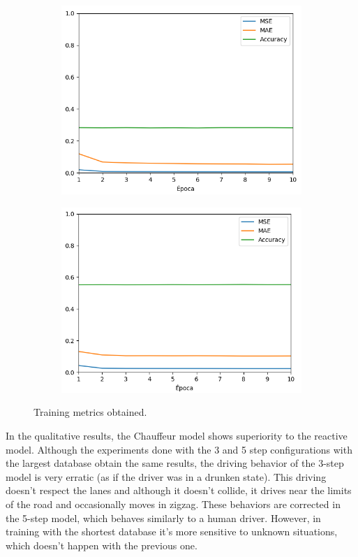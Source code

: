 \documentclass[conference]{IEEEtran}
\begin{document}
\begin{figure}[h]
\begin{subfigure}{0.24\textwidth}
		\includegraphics[width=\textwidth]{img/chauffeur3m}
		\label{subfig:5}
	\end{subfigure}
	\begin{subfigure}{0.24\textwidth} 
		\includegraphics[width=\textwidth]{img/chauffeur5m}
		\label{subfig:6}
	\end{subfigure}
	\caption{Training metrics obtained.} 
	\label{fig:pilottest}
\end{figure}

In the qualitative results, the Chauffeur model shows superiority to the reactive model. Although the experiments done with the 3 and 5 step configurations with the largest database obtain the same results, the driving behavior of the 3-step model is very erratic (as if the driver was in a drunken state). This driving doesn't respect the lanes and although it doesn't collide, it drives near the limits of the road and occasionally moves in zigzag. These behaviors are corrected in the 5-step model, which behaves similarly to a human driver. However, in training with the shortest database it's more sensitive to unknown situations, which doesn't happen with the previous one.
\end{document}
